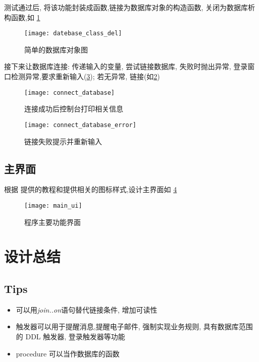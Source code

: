 \documentclass{myreport}
\begin{document}
    测试通过后, 将该功能封装成函数,链接为数据库对象的构造函数,
    关闭为数据库析构函数,如
    \cref{fig:datebase_class_del}
    \begin{figure}[H]
      \centering
      \texttt{[image: datebase\_class\_del]}
      \caption{简单的数据库对象图}
      \label{fig:datebase_class_del}
    \end{figure}

    接下来让数据库连接:
    传递输入的变量, 尝试链接数据库,
    失败时抛出异常, 登录窗口检测异常,要求重新输入(\cref{fig:connect_database_error}); 若无异常, 链接(如\cref{fig:connect_database})

    \begin{figure}[H]
      \centering
      \texttt{[image: connect\_database]}
      \caption{连接成功后控制台打印相关信息}
      \label{fig:connect_database}
    \end{figure}

    \begin{figure}[H]
      \centering
      \texttt{[image: connect\_database\_error]}
      \caption{链接失败提示并重新输入}
      \label{fig:connect_database_error}
    \end{figure}

  \subsection{主界面}
    根据 \cite{pyqt5_beautify} 提供的教程和\cite{icon}提供相关的图标样式,设计主界面如
    \cref{fig:main_ui}
    \begin{figure}[H]
      \centering
      \texttt{[image: main\_ui]}
      \caption{程序主要功能界面}
      \label{fig:main_ui}
    \end{figure}

\section{设计总结}
  \subsection{Tips}
    \begin{itemize}
      \item 可以用\emph{join..on}语句替代链接条件, 增加可读性
      \item 触发器可以用于提醒消息,提醒电子邮件,
        强制实现业务规则,
        具有数据库范围的 DDL 触发器,
        登录触发器等功能
      \item procedure 可以当作数据库的函数
    \end{itemize}
\end{document}
